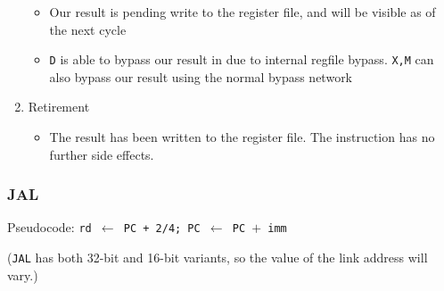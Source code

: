\documentclass{article}
\begin{document}
\begin{enumerate}
\begin{itemize}
		\item Our result is pending write to the register file, and will be visible as of the next cycle
		\item \texttt{D} is able to bypass our result in due to internal regfile bypass. \texttt{X,M} can also bypass our result using the normal bypass network
	\end{itemize}
	\item Retirement
	\begin{itemize}
		\item The result has been written to the register file. The instruction has no further side effects.
	\end{itemize}
\end{enumerate} 


\subsubsection{JAL}

Pseudocode: \texttt{rd $\leftarrow$ PC + 2/4;  PC $\leftarrow$ PC $+$ imm}

(\texttt{JAL} has both 32-bit and 16-bit variants, so the value of the link address will vary.)
\end{document}
